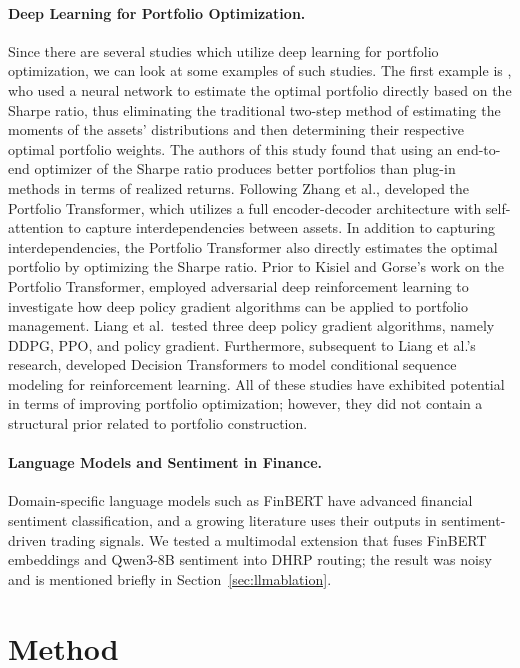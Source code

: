 \paragraph{Deep Learning for Portfolio Optimization.} Since there are several studies which utilize deep learning for portfolio optimization, we can look at some examples of such studies. The first example is \citet{Zhang2020}, who used a neural network to estimate the optimal portfolio directly based on the Sharpe ratio, thus eliminating the traditional two-step method of estimating the moments of the assets' distributions and then determining their respective optimal portfolio weights. The authors of this study found that using an end-to-end optimizer of the Sharpe ratio produces better portfolios than plug-in methods in terms of realized returns. Following Zhang et al., \citet{KisielGorse2022} developed the Portfolio Transformer, which utilizes a full encoder-decoder architecture with self-attention to capture interdependencies between assets. In addition to capturing interdependencies, the Portfolio Transformer also directly estimates the optimal portfolio by optimizing the Sharpe ratio. Prior to Kisiel and Gorse's work on the Portfolio Transformer, \citet{Liang2018} employed adversarial deep reinforcement learning to investigate how deep policy gradient algorithms can be applied to portfolio management. Liang et al.\ tested three deep policy gradient algorithms, namely DDPG, PPO, and policy gradient. Furthermore, subsequent to Liang et al.'s research, \citet{Chen2021} developed Decision Transformers to model conditional sequence modeling for reinforcement learning. All of these studies have exhibited potential in terms of improving portfolio optimization; however, they did not contain a structural prior related to portfolio construction.

\paragraph{Language Models and Sentiment in Finance.} Domain-specific language models such as FinBERT \citep{Huang2023} have advanced financial sentiment classification, and a growing literature uses their outputs in sentiment-driven trading signals. We tested a multimodal extension that fuses FinBERT embeddings and Qwen3-8B \citep{Qwen2025} sentiment into DHRP routing; the result was noisy and is mentioned briefly in Section~\ref{sec:llmablation}.

\section{Method}
\label{sec:method}

